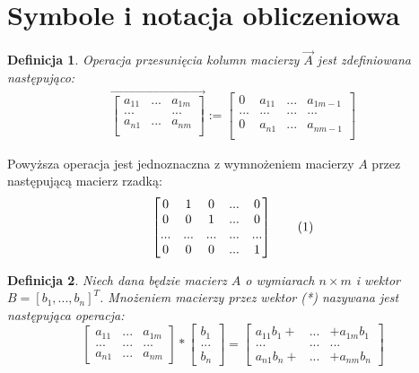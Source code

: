 \documentclass[12pt]{book}
\theoremstyle{plain}
\newtheorem{definicja}{Definicja}
\newcommand\addtag{\refstepcounter{equation}
\renewcommand{\labelenumii}{\theenumii}
\renewcommand{\theenumii}{\theenumi.\arabic{enumii}.}
\tag{\theequation}}
\begin{document}
\section{Symbole i notacja obliczeniowa}
\begin{definicja} Operacja przesunięcia kolumn macierzy $\overrightarrow{A}$ jest zdefiniowana następująco:
\begin{gather}
\overrightarrow{
  \begin{bmatrix}
   a_{11} & ... & a_{1m}\\
   ... & & ...\\
   a_{n1} & ... & a_{nm}\\
   \end{bmatrix}}
 :=
  \begin{bmatrix}
   0 & a_{11} & ... & a_{1m-1}\\
   ... & ... & ... & ...\\
   0 & a_{n1} & ... & a_{nm-1}\\
   \end{bmatrix}
   \end{gather}
\end{definicja}\noindent
Powyższa operacja jest jednoznaczna z wymnożeniem macierzy $A$ przez następującą macierz rzadką:
\[
\begin{bmatrix}
   0 & 1 &0 &...&0 \\
   0 & 0 &1 &...&0 \\
   ... & ...&... &...&... \\
   0 & 0 &0 &...&1 \\
   \end{bmatrix} \addtag
\]
\begin{definicja}
Niech dana będzie macierz $A$ o wymiarach $n \times m$ i wektor $B=[b_1,...,b_n]^T$. Mnożeniem macierzy przez wektor (*) nazywana jest następująca operacja:
\[
\begin{bmatrix}
a_{11} & ... & a_{1m}\\
... & ... & ...\\
a_{n1} & ... & a_{nm}
\end{bmatrix}
*
\begin{bmatrix}
b_1 \\ ... \\ b_n
\end{bmatrix}
=\begin{bmatrix}
a_{11}b_1 + & ... & + a_{1m}b_1\\
... & ... & ...\\
a_{n1}b_n + & ... & + a_{nm}b_n
\end{bmatrix}
\]
\end{definicja}
\end{document}

